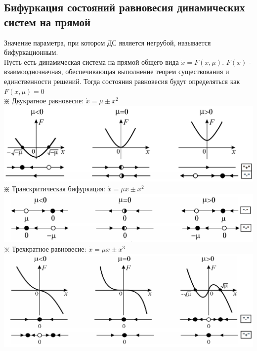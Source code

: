 \begin{multicols*}{2}
		\section{Бифуркация состояний равновесия динамических систем на прямой}
		Значение параметра, при котором ДС является негрубой, называется бифуркационным.\\
		Пусть есть динамическая система на прямой общего вида $\dot{x} = F(x, \mu)$. $F(x)$ - взаимооднозначная, обеспечивающая выполнение теорем существования и единственности решений. Тогда состояния равновесия будут определяться как $F(x, \mu) = 0$\\
		$\divideontimes$ Двукратное равновесие: $\dot{x} = \mu \pm x^2$\\
		\includegraphics[width=0.75\linewidth]{tk_img/bifurk_1.png}\\
		$\divideontimes$ Транскритическая бифуркация: $\dot{x} = \mu x \pm x^2$\\
		\includegraphics[width=0.75\linewidth]{tk_img/bifurk_2.png}\\
		$\divideontimes$ Трехкратное равновесие: $\dot{x} = \mu x \pm x^3$\\
		\includegraphics[width=0.75\linewidth]{tk_img/bifurk_3.png}\\
		

\end{multicols*}
